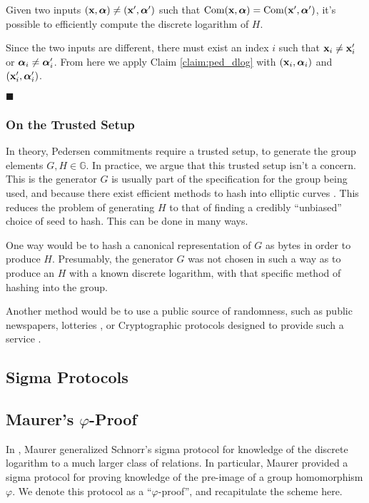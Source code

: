 \begin{claim}
    Given two inputs $(\textbf{x}, \boldsymbol{\alpha}) \neq (\textbf{x}', \boldsymbol{\alpha}')$ such that
    $\text{Com}(\textbf{x}, \boldsymbol{\alpha}) = \text{Com}(\textbf{x}', \boldsymbol{\alpha}')$, it's possible
    to efficiently compute the discrete logarithm of $H$.
\end{claim}

Since the two inputs are different, there must exist an index $i$
such that $\textbf{x}_i \neq \textbf{x}_i'$ or $\boldsymbol{\alpha}_i \neq \boldsymbol{\alpha}_i'$.
From here we apply Claim \ref{claim:ped_dlog} with $(\textbf{x}_i, \boldsymbol{\alpha}_i)$ and
$(\textbf{x}_i', \boldsymbol{\alpha}'_i)$.

$\blacksquare$

\subsubsection{On the Trusted Setup}

In theory, Pedersen commitments require a trusted setup, to generate
the group elements $G, H \in \mathbb{G}$. In practice, we argue that
this trusted setup isn't a concern. This is the generator $G$
is usually part of the specification for the group being used,
and because there exist
efficient methods to hash into elliptic curves \cite{icart_how_2009}.
This reduces the problem of generating $H$ to that of finding a credibly
``unbiased'' choice of seed to hash. This can be done in many ways.

One way would be to hash a canonical representation of $G$ as bytes in order
to produce $H$. Presumably, the generator $G$ was not chosen in such
a way as to produce an $H$ with a known discrete logarithm, with
that specific method of hashing into the group.

Another method would be to use a public source of randomness,
such as public newspapers, lotteries
\cite{baigneres_trap_2015}, or Cryptographic protocols
designed to provide such a service \cite{fischer_public_2011}.

\subsection{Sigma Protocols}

\subsection{Maurer's \texorpdfstring{$\varphi$}{varphi}-Proof}

In \cite{maurer_unifying_2009}, Maurer generalized Schnorr's sigma 
protocol for knowledge of the discrete logarithm \cite{schnorr_efficient_1990} to a much larger class
of relations. In particular, Maurer provided a sigma protocol for
proving knowledge of the pre-image of a group homomorphism $\varphi$.
We denote this protocol as a ``$\varphi$-proof'', and recapitulate the scheme
here.

